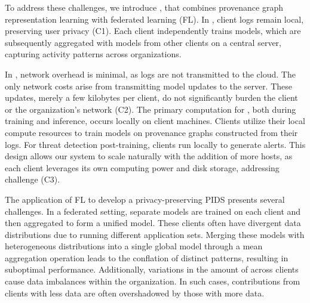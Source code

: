 To address these challenges, we introduce \Sys, that combines provenance graph representation learning with federated learning (FL). In \Sys, client logs remain local, preserving user privacy (C1). Each client independently trains \gnnshort models, which are subsequently aggregated with models from other clients on a central server, capturing activity patterns across organizations.

In \Sys, network overhead is minimal, as logs are not transmitted to the cloud. The only network costs arise from transmitting model updates to the server. These updates, merely a few kilobytes per client, do not significantly burden the client or the organization's network (C2). The primary computation for \Sys, both during training and inference, occurs locally on client machines. Clients utilize their local compute resources to train models on provenance graphs constructed from their logs. For threat detection post-training, clients run \Sys locally to generate alerts. This design allows our system to scale naturally with the addition of more hosts, as each client leverages its own computing power and disk storage, addressing challenge (C3).




The application of FL to develop a privacy-preserving PIDS presents several challenges. In a federated setting, separate models are trained on each client and then aggregated to form a unified model. These clients often have divergent data distributions due to running different application sets. Merging these models with heterogeneous distributions into a single global model through a mean aggregation operation leads to the conflation of distinct patterns, resulting in suboptimal performance. Additionally, variations in the amount of \logs across clients cause data imbalances within the organization. In such cases, contributions from clients with less data are often overshadowed by those with more data.

